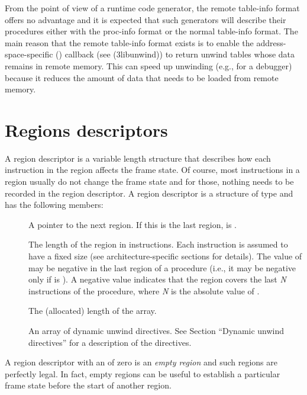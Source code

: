 \documentclass{article}
\begin{document}
From the point of view of a runtime code generator, the remote
table-info format offers no advantage and it is expected that such
generators will describe their procedures either with the proc-info
format or the normal table-info format.  The main reason that the
remote table-info format exists is to enable the
address-space-specific () callback (see
(3libunwind)) to return unwind tables whose
data remains in remote memory.  This can speed up unwinding (e.g., for
a debugger) because it reduces the amount of data that needs to be
loaded from remote memory.

\section{Regions descriptors}

A region descriptor is a variable length structure that describes how
each instruction in the region affects the frame state.  Of course,
most instructions in a region usually do not change the frame state and
for those, nothing needs to be recorded in the region descriptor.  A
region descriptor is a structure of type
 and has the following members:
\begin{description}
\item[] A pointer to the
  next region.  If this is the last region,  is .
\item[ ] The length of the region in
  instructions.  Each instruction is assumed to have a fixed size (see
  architecture-specific sections for details).  The value of
   may be negative in the last region of a procedure
  (i.e., it may be negative only if  is ).  A
  negative value indicates that the region covers the last \emph{N}
  instructions of the procedure, where \emph{N} is the absolute value
  of .
\item[ ] The (allocated) length of
  the  array.
\item[ ] An array of dynamic unwind
  directives.  See Section ``Dynamic unwind directives'' for a
  description of the directives.
\end{description}
A region descriptor with an  of zero is an
\emph{empty region} and such regions are perfectly legal.  In fact,
empty regions can be useful to establish a particular frame state
before the start of another region.
\end{document}
